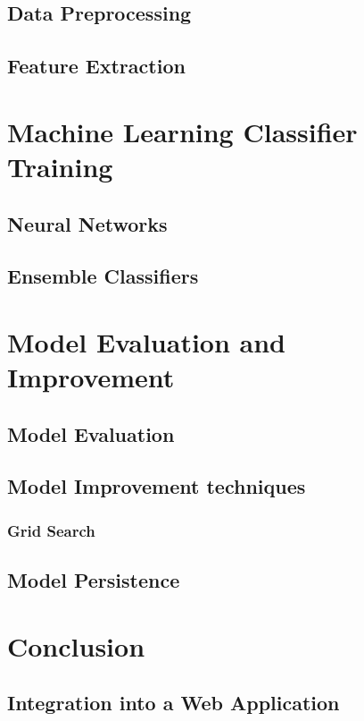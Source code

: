 \documentclass[a4paper,12pt]{report}
\begin{document}
	\section{Data Preprocessing}
	\section{Feature Extraction}
	
\chapter{Machine Learning Classifier Training}
	\section{Neural Networks}
	\section{Ensemble Classifiers}

\chapter{Model Evaluation and Improvement}
	\section{Model Evaluation}
	\section{Model Improvement techniques}
		\subsection{Grid Search}
	\section{Model Persistence} 
		
\chapter{Conclusion}
	\section{Integration into a Web Application}
\end{document}
